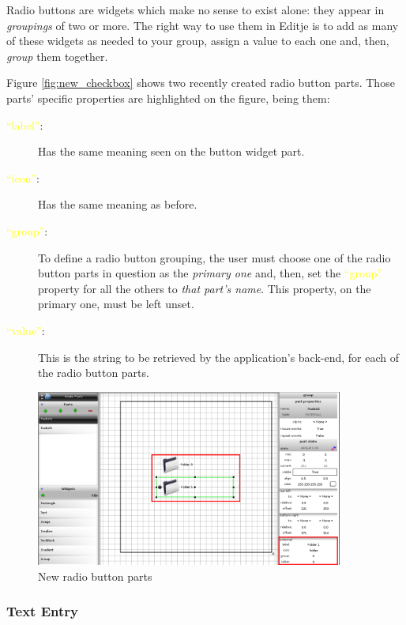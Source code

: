 \documentclass[a4paper]{profusion}
\newcommand{\GUIEditable}[1]{\textcolor{yellow}{#1}} %
\begin{document}
Radio buttons are widgets which make no sense to exist alone: they
appear in \emph{groupings} of two or more. The right way to use them
in Editje is to add as many of these widgets as needed to your group,
assign a value to each one and, then, \emph{group} them together.

Figure \ref{fig:new_checkbox} shows two recently created radio button
parts. Those parts' specific properties are highlighted on the figure,
being them:

\begin{description}
  \item[\GUIEditable{``label''}:] Has the same meaning seen on the
    button widget part.
  \item[\GUIEditable{``icon''}:] Has the same meaning as before.
  \item[\GUIEditable{``group''}:] To define a radio button grouping,
    the user must choose one of the radio button parts in question as
    the \emph{primary one} and, then, set the \GUIEditable{``group''}
    property for all the others to \emph{that part's name}. This
    property, on the primary one, must be left unset.
  \item[\GUIEditable{``value''}:] This is the string to be retrieved
    by the application's back-end, for each of the radio button parts.
\end{description}

\begin{figure}[h!]
  \centering
  \includegraphics[width=0.9\textwidth]{images/new_radio.png}
  \caption{New radio button parts}
  \label{fig:new_radio}
\end{figure}

\subsubsection{Text Entry}
\end{document}

